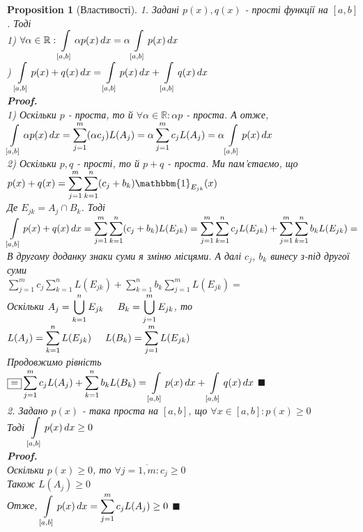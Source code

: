 \documentclass[a4paper, 14pt]{extarticle}
\def\huge{\displaystyle}
\def\bigline{\vspace{5mm}\\}
\theoremstyle{theoremdd}
\theoremstyle{theoremdd}
\theoremstyle{theoremdd}
\theoremstyle{theoremdd}
\theoremstyle{theoremdd}
\newtheorem{proposition}[theorem]{Proposition}
\theoremstyle{theoremdd}
\theoremstyle{theoremdd}
\theoremstyle{theoremdd}
\newenvironment{pfNoTh}{\textbf{Proof. \\}}{$\blacksquare$}
\begin{document}
\begin{proposition}[Властивості]
1. Задані $p(x), q(x)$ - прості функції на $[a,b]$. Тоді\\
1) $\huge \forall \alpha \in \mathbb{R}: \int\displaylimits_{[a,b]} \alpha p(x)\,dx = \alpha \int\displaylimits_{[a,b]} p(x)\,dx$\\
) $\huge \int\displaylimits_{[a,b]} p(x)+q(x)\,dx = \int\displaylimits_{[a,b]} p(x)\,dx + \int\displaylimits_{[a,b]} q(x)\,dx$\\

\begin{pfNoTh}
1) Оскільки $p$ - проста, то й $\forall \alpha \in \mathbb{R}: \alpha p$ - проста. А отже,\\
$\huge \int\displaylimits_{[a,b]} \alpha p(x)\,dx = \sum_{j=1}^m (\alpha c_j) L(A_j) = \alpha \sum_{j=1}^m c_j L(A_j) = \alpha \int\displaylimits_{[a,b]} p(x)\,dx$
\bigline
2) Оскільки $p,q$ - прості, то й $p+q$ - проста. Ми пам'єтаємо, що\\
$p(x) + q(x) = \huge \sum_{j=1}^m \sum_{k=1}^n (c_j+b_k) \mathbbm{1}_{E_{jk}}(x)$\\
Де $E_{jk} = A_j \cap B_k$. Тоді\\
$\huge \int\displaylimits_{[a,b]} p(x)+q(x)\,dx = \sum_{j=1}^m \sum_{k=1}^n (c_j+b_k) L(E_{jk}) = \sum_{j=1}^m \sum_{k=1}^n c_j L(E_{jk}) + \sum_{j=1}^m \sum_{k=1}^n b_k L(E_{jk})=$\\
В другому доданку знаки суми я зміню місцями. А далі $c_j$, $b_k$ винесу з-під другої суми\\
$\huge \sum_{j=1}^m c_j \sum_{k=1}^n L(E_{jk}) + \sum_{k=1}^n b_k \sum_{j=1}^m L(E_{jk}) \boxed{=}$\\
Оскільки $\huge A_j = \bigcup_{k=1}^n E_{jk} \hspace{0.5cm} B_k = \bigcup_{j=1}^m E_{jk}$, то\\
$L(A_j) = \huge \sum_{k=1}^n L(E_{jk}) \hspace{0.5cm} L(B_k) = \sum_{j=1}^m L(E_{jk})$\\
Продовжимо рівність\\
$\boxed{=} \huge \sum_{j=1}^m c_j L(A_j) + \sum_{k=1}^n b_k L(B_k) = \int\displaylimits_{[a,b]} p(x)\,dx + \int\displaylimits_{[a,b]} q(x)\,dx$
\end{pfNoTh}
\bigline

2. Задано $p(x)$ - така проста на $[a,b]$, що $\forall x \in [a,b]: p(x) \geq 0$\\
\bigskip
Тоді $\huge \int\displaylimits_{[a,b]} p(x)\,dx \geq 0$\\
\begin{pfNoTh}
Оскільки $p(x) \geq 0$, то $\forall j=\overline{1,m}: c_j \geq 0$\\
Також $L(A_j) \geq 0$\\
Отже, $\huge \int\displaylimits_{[a,b]} p(x)\,dx = \sum_{j=1}^m c_j L(A_j) \geq 0$
\end{pfNoTh}
\bigline


\end{proposition}
\end{document}
